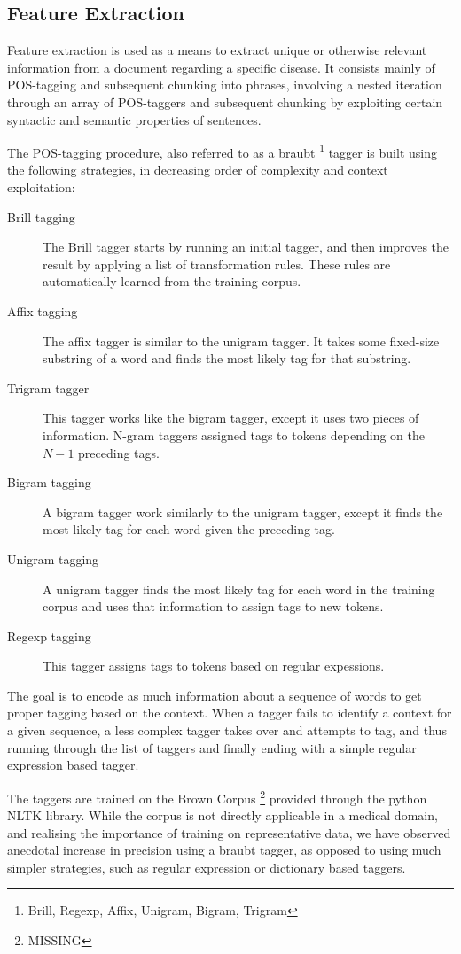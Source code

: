 \documentclass[10pt,letterpaper,final]{article}
\begin{document}
\subsection{Feature Extraction}
Feature extraction is used as a means to extract unique or otherwise
relevant information from a document regarding a specific disease. It
consists mainly of POS-tagging and subsequent chunking into phrases,
involving a nested iteration through an array of POS-taggers and
subsequent chunking by exploiting certain syntactic and semantic
properties of sentences.


The POS-tagging procedure, also referred to as a
braubt \cite{} \footnote{Brill, Regexp, Affix, Unigram, Bigram, Trigram}
tagger is built using the following strategies, in decreasing order of
complexity and context exploitation:
\begin{description}
\item[Brill tagging] The Brill\cite{Brill:1992:SRP:974499.974526} tagger
starts by running an initial tagger, and then improves the result by
applying a list of transformation rules. These rules are automatically
learned from the training corpus.
\item[Affix tagging] The affix tagger is similar to the unigram tagger.
It takes some fixed-size substring of a word and finds the most likely
tag for that substring.
\item[Trigram tagger] This tagger works like the bigram tagger, except it
uses two pieces of information. N-gram taggers assigned tags to tokens
depending on the $N - 1$ preceding tags.
\item[Bigram tagging] A bigram tagger work similarly to the unigram
tagger, except it finds the most likely tag for each word given the
preceding tag.
\item[Unigram tagging] A unigram tagger finds the most likely tag for each word
in the training corpus and uses that information to assign tags to new
tokens.
\item[Regexp tagging] This tagger assigns tags to tokens based on regular
expessions.
\end{description}
The goal is to encode as much information about a sequence of words to
get proper tagging based on the context. When a tagger fails to identify
a context for a given sequence, a less complex tagger takes over and
attempts to tag, and thus running through the list of taggers and
finally ending with a simple regular expression based tagger.

The taggers are trained on the Brown Corpus \footnote{MISSING} provided
through the python NLTK library. While the corpus is not directly
applicable in a medical domain, and realising the importance of training
on representative data, we have observed anecdotal increase in precision
using a braubt tagger, as opposed to using much simpler strategies, such
as regular expression or dictionary based taggers.
\end{document}
